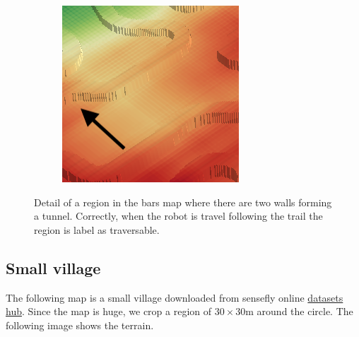 \documentclass[../document.tex]{subfiles}
\begin{document}
\begin{figure}[H]
\begin{subfigure}[b]{0.23\textwidth}
  \end{subfigure}
  \begin{subfigure}[b]{0.23\textwidth}
      \includegraphics[width=\linewidth]{../img/4/traversability/bars/tunnel/-180-crop.png}  
  \end{subfigure}
  \caption{Detail of a region in the bars map where there are two walls forming a tunnel. Correctly, when the robot is travel following the trail the region is label as traversable.}
  \end{figure}

\subsection{Small village}
The following map is a small village downloaded from sensefly online \href{https://www.sensefly.com/education/datasets/?dataset=1420}{datasets hub}. Since the map is huge, we crop a region of $30 \times 30$m around the circle. The following image shows the terrain.
\end{document}
